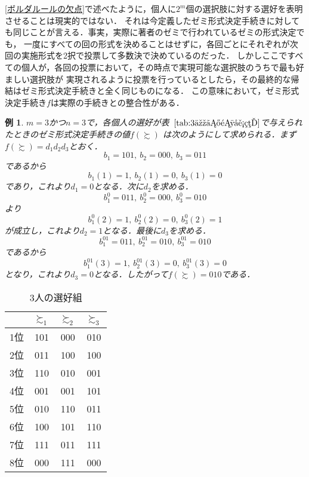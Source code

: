 \documentclass[dvipdfmx]{jsarticle}
\newtheorem{example}{例}[section]
\begin{document}
\ref{ボルダルールの欠点}で述べたように，個人に$2^m$個の選択肢に対する選好を表明させることは現実的ではない．
それは今定義したゼミ形式決定手続きに対しても同じことが言える．事実，実際に著者のゼミで行われているゼミの形式決定でも，
一度にすべての回の形式を決めることはせずに，各回ごとにそれぞれが次回の実施形式を2択で投票して多数決で決めているのだった．
しかしここですべての個人が，各回の投票において，その時点で実現可能な選択肢のうちで最も好ましい選択肢が
実現されるように投票を行っているとしたら，その最終的な帰結はゼミ形式決定手続きと全く同じものになる．
この意味において，ゼミ形式決定手続き$f$は実際の手続きとの整合性がある．

\begin{example}
$m=3$かつ$n=3$で，各個人の選好が表~$\ref{tab:3人の選好組}$で与えられたときのゼミ形式決定手続きの値$f(\succsim)$
は次のようにして求められる．まず$f(\succsim) = d_1d_2d_3$とおく．
\[
  b_1 = 101,\ b_2 = 000,\ b_3 = 011
\]
であるから
\[
  b_1(1) = 1,\ b_2(1) = 0,\ b_3(1) = 0
\]
であり，これより$d_1 = 0$となる．次に$d_2$を求める．
\[
  b_1^0 = 011,\ b_2^0 = 000,\ b_3^0 = 010
\]
より
\[
  b_1^0(2) = 1,\ b_2^0(2) = 0,\ b_3^0(2) = 1
\]
が成立し，これより$d_2 = 1$となる．最後に$d_3$を求める．
\[
  b_1^{01} = 011,\ b_2^{01} = 010,\ b_3^{01} = 010
\]
であるから
\[
  b_1^{01}(3) = 1,\ b_2^{01}(3) = 0,\ b_3^{01}(3) = 0
\]
となり，これより$d_3 = 0$となる．したがって$f(\succsim) = 010$である．
  
\end{example}

\begin{table}[h]
  \begin{center}
  \caption{3人の選好組}\label{tab:3人の選好組}
  \begin{tabular}{c|c|c|c} \hline
    & $\succsim_1$ & $\succsim_2$ & $\succsim_3$ \\ \hline
  1位 & 101 & 000 & 010 \\
  2位 & 011 & 100 & 100 \\
  3位 & 110 & 010 & 001 \\
  4位 & 001 & 001 & 101 \\
  5位 & 010 & 110 & 011 \\
  6位 & 100 & 101 & 110 \\
  7位 & 111 & 011 & 111 \\
  8位 & 000 & 111 & 000 \\ \hline 
  \end{tabular}
\end{center}
\end{table}
\end{document}
